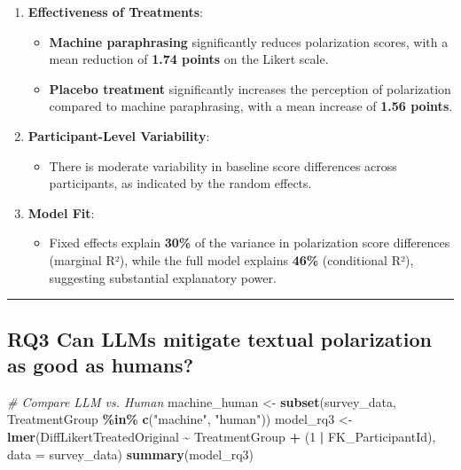 \documentclass[
]{article}
\newenvironment{Shaded}{\begin{snugshade}}{\end{snugshade}}
\newcommand{\AttributeTok}[1]{\textcolor[rgb]{0.13,0.29,0.53}{#1}}
\newcommand{\CommentTok}[1]{\textcolor[rgb]{0.56,0.35,0.01}{\textit{#1}}}
\newcommand{\DecValTok}[1]{\textcolor[rgb]{0.00,0.00,0.81}{#1}}
\newcommand{\FunctionTok}[1]{\textcolor[rgb]{0.13,0.29,0.53}{\textbf{#1}}}
\newcommand{\NormalTok}[1]{#1}
\newcommand{\OtherTok}[1]{\textcolor[rgb]{0.56,0.35,0.01}{#1}}
\newcommand{\SpecialCharTok}[1]{\textcolor[rgb]{0.81,0.36,0.00}{\textbf{#1}}}
\newcommand{\StringTok}[1]{\textcolor[rgb]{0.31,0.60,0.02}{#1}}
\providecommand{\tightlist}{%
  \setlength{\itemsep}{0pt}\setlength{\parskip}{0pt}}
\begin{document}
\begin{enumerate}
\def\labelenumi{\arabic{enumi}.}
\tightlist
\item
  \textbf{Effectiveness of Treatments}:

  \begin{itemize}
  \tightlist
  \item
    \textbf{Machine paraphrasing} significantly reduces polarization
    scores, with a mean reduction of \textbf{1.74 points} on the Likert
    scale.
  \item
    \textbf{Placebo treatment} significantly increases the perception of
    polarization compared to machine paraphrasing, with a mean increase
    of \textbf{1.56 points}.
  \end{itemize}
\item
  \textbf{Participant-Level Variability}:

  \begin{itemize}
  \tightlist
  \item
    There is moderate variability in baseline score differences across
    participants, as indicated by the random effects.
  \end{itemize}
\item
  \textbf{Model Fit}:

  \begin{itemize}
  \tightlist
  \item
    Fixed effects explain \textbf{30\%} of the variance in polarization
    score differences (marginal R²), while the full model explains
    \textbf{46\%} (conditional R²), suggesting substantial explanatory
    power.
  \end{itemize}
\end{enumerate}

\begin{center}\rule{0.5\linewidth}{0.5pt}\end{center}

\subsection{\texorpdfstring{\textbf{RQ3} Can LLMs mitigate textual
polarization as good as
humans?}{RQ3 Can LLMs mitigate textual polarization as good as humans?}}\label{rq3-can-llms-mitigate-textual-polarization-as-good-as-humans}

\begin{Shaded}
\begin{Highlighting}[]
\CommentTok{\# Compare LLM vs. Human}
\NormalTok{machine\_human }\OtherTok{\textless{}{-}} \FunctionTok{subset}\NormalTok{(survey\_data, TreatmentGroup }\SpecialCharTok{\%in\%} \FunctionTok{c}\NormalTok{(}\StringTok{"machine"}\NormalTok{, }\StringTok{"human"}\NormalTok{))}
\NormalTok{model\_rq3 }\OtherTok{\textless{}{-}} \FunctionTok{lmer}\NormalTok{(DiffLikertTreatedOriginal }\SpecialCharTok{\textasciitilde{}}\NormalTok{ TreatmentGroup }\SpecialCharTok{+}\NormalTok{ (}\DecValTok{1} \SpecialCharTok{|}\NormalTok{ FK\_ParticipantId), }
                  \AttributeTok{data =}\NormalTok{ survey\_data)}
\FunctionTok{summary}\NormalTok{(model\_rq3)}
\end{Highlighting}
\end{Shaded}
\end{document}
